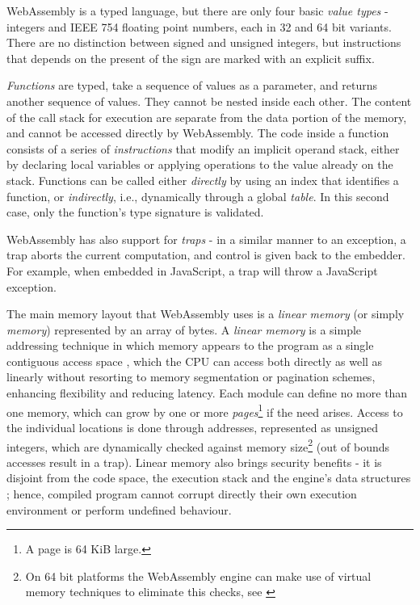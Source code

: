 
WebAssembly is a typed language, but there are only four basic \textit{value types} - integers and IEEE 754 floating
point numbers, each in 32 and 64 bit variants. There are no distinction between signed and unsigned integers,
but instructions that depends on the present of the sign are marked with an explicit suffix.

\textit{Functions} are typed, take a sequence of values as a parameter, and returns another sequence of values.
They cannot be nested inside each other. The content of the call stack for execution are separate from the data
portion of the memory, and cannot be accessed directly by WebAssembly.
The code inside a function consists of a series of \textit{instructions} that modify an implicit operand stack,
either by declaring local variables or applying operations to the value already on the stack.
Functions can be called either \textit{directly} by using an index that identifies a function, or \textit{indirectly},
i.e., dynamically through a global \textit{table}. In this second case, only the function's type signature is validated.

WebAssembly has also support for \textit{traps} - in a similar manner to an exception, a trap aborts the current
computation, and control is given back to the embedder. For example, when embedded in JavaScript, a trap will
throw a JavaScript exception.

The main memory layout that WebAssembly uses is a \textit{linear memory} (or simply \textit{memory}) represented
by an array of bytes. A \textit{linear memory} is a simple addressing technique in which memory appears to the
program as a single contiguous access space \cite{processor-microarchitecture}, which the CPU can access both directly as well as linearly
without resorting to memory segmentation or pagination schemes, enhancing flexibility and reducing latency.
Each module can define no more than one memory, which can grow by one or more
\textit{pages}\footnote{A page is 64 KiB large.} if the need arises.
Access to the individual locations is done through addresses, represented as unsigned integers,
which are dynamically checked against memory size\footnote{On 64 bit platforms the WebAssembly engine
can make use of virtual memory techniques to eliminate this checks, see \cite{bringing-the-web-up-to-speed-2017}}
(out of bounds accesses result in a trap).
Linear memory also brings security benefits - it is disjoint from the code space, the execution stack and the engine's
data structures \cite{bringing-the-web-up-to-speed-2017}; hence, compiled program cannot corrupt directly their own execution
environment or perform undefined behaviour.

